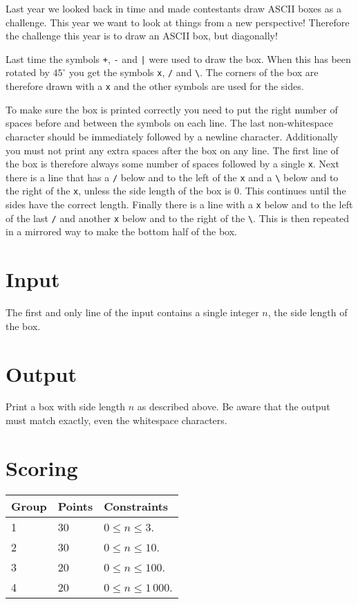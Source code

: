 
Last year we looked back in time and made contestants draw ASCII boxes as a challenge.
This year we want to look at things from a new perspective!
Therefore the challenge this year is to draw an ASCII box, but diagonally!

Last time the symbols \texttt{+}, \texttt{-} and \texttt{|} were used to draw the box.
When this has been rotated by $45^\circ$ you get the symbols \texttt{x}, \texttt{/} and \texttt{\textbackslash}.
The corners of the box are therefore drawn with a \texttt{x} and the other symbols are used for the sides.

To make sure the box is printed correctly you need to put the right number of spaces before and between the
symbols on each line. The last non-whitespace character should be immediately followed by a newline character.
Additionally you must not print any extra spaces after the box on any line.
The first line of the box is therefore always some number of spaces followed by a single \texttt{x}.
Next there is a line that has a \texttt{/} below and to the left of the \texttt{x} and
a \texttt{\textbackslash} below and to the right of the \texttt{x}, unless the side length of the box is $0$.
This continues until the sides have the correct length.
Finally there is a line with a \texttt{x} below and to the left of the last \texttt{/} and another
\texttt{x} below and to the right of the \texttt{\textbackslash}.
This is then repeated in a mirrored way to make the bottom half of the box.

\section*{Input}
The first and only line of the input contains a single integer $n$, the side length of the box.

\section*{Output}
Print a box with side length $n$ as described above.
Be aware that the output must match exactly, even the whitespace characters.

\section*{Scoring}
\begin{tabular}{|l|l|l|}
\hline
Group & Points & Constraints \\ \hline
1     & 30   & $0 \leq n \leq 3$. \\ \hline
2     & 30   & $0 \leq n \leq 10$. \\ \hline
3     & 20   & $0 \leq n \leq 100$. \\ \hline
4     & 20   & $0 \leq n \leq 1\,000$. \\ \hline
\end{tabular}
